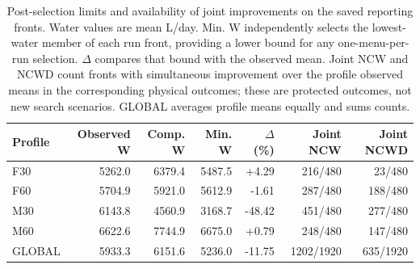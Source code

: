 \begin{table}[pos=h]
\centering\small
\caption{Post-selection limits and availability of joint improvements on the saved reporting fronts. Water values are mean L/day. Min. W independently selects the lowest-water member of each run front, providing a lower bound for any one-menu-per-run selection. $\Delta$ compares that bound with the observed mean. Joint NCW and NCWD count fronts with simultaneous improvement over the profile observed means in the corresponding physical outcomes; these are protected outcomes, not new search scenarios. GLOBAL averages profile means equally and sums counts.}
\label{tab:compromise-feasibility}
\begin{tabularx}{\textwidth}{Xrrrrrr}
\toprule
Profile & Observed W & Comp. W & Min. W & $\Delta$ (\%) & Joint NCW & Joint NCWD \\
\midrule
F30 & 5262.0 & 6379.4 & 5487.5 & +4.29 & 216/480 & 23/480 \\
\midrule
F60 & 5704.9 & 5921.0 & 5612.9 & -1.61 & 287/480 & 188/480 \\
\midrule
M30 & 6143.8 & 4560.9 & 3168.7 & -48.42 & 451/480 & 277/480 \\
\midrule
M60 & 6622.6 & 7744.9 & 6675.0 & +0.79 & 248/480 & 147/480 \\
\midrule
GLOBAL & 5933.3 & 6151.6 & 5236.0 & -11.75 & 1202/1920 & 635/1920 \\
\bottomrule
\end{tabularx}
\end{table}
